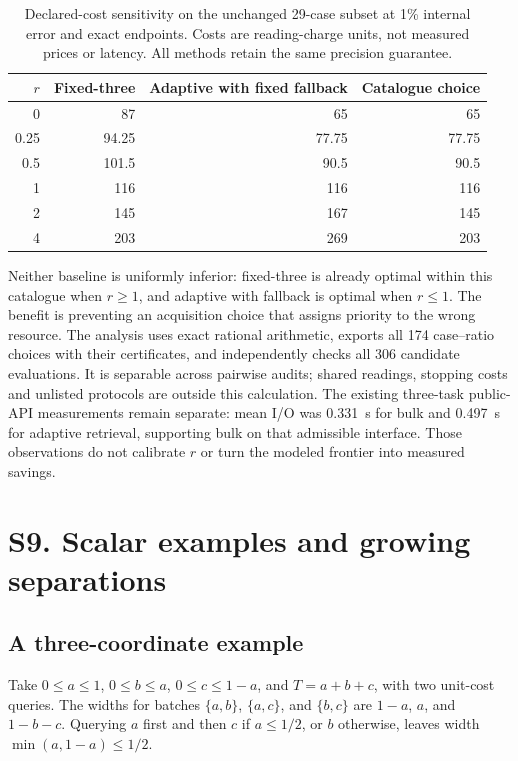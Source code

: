 \begin{table}[htbp]\centering\small
\caption{Declared-cost sensitivity on the unchanged 29-case subset at 1\%
internal error and exact endpoints. Costs are reading-charge units, not
measured prices or latency. All methods retain the same precision guarantee.}
\label{tab:protocol-cost-frontier}
\begin{tabular}{rrrr}\hline
$r$ & Fixed-three & Adaptive with fixed fallback & Catalogue choice\\\hline
0 & 87 & 65 & 65\\
0.25 & 94.25 & 77.75 & 77.75\\
0.5 & 101.5 & 90.5 & 90.5\\
1 & 116 & 116 & 116\\
2 & 145 & 167 & 145\\
4 & 203 & 269 & 203\\\hline
\end{tabular}\end{table}

Neither baseline is uniformly inferior: fixed-three is already optimal
within this catalogue when $r\geq1$, and adaptive with fallback is optimal
when $r\leq1$. The benefit is preventing an acquisition choice that assigns
priority to the wrong resource. The analysis uses exact rational arithmetic,
exports all 174 case--ratio choices with their certificates, and independently
checks all 306 candidate evaluations. It is separable across pairwise audits;
shared readings, stopping costs and unlisted protocols are outside this
calculation. The existing three-task public-API measurements remain separate:
mean I/O was 0.331~s for bulk and 0.497~s for adaptive retrieval, supporting
bulk on that admissible interface. Those observations do not calibrate $r$
or turn the modeled frontier into measured savings.
\section{S9. Scalar examples and growing separations}
\subsection{A three-coordinate example}
\label{sec:risk_small_example}
Take $0\le a\le1$, $0\le b\le a$, $0\le c\le1-a$, and
$T=a+b+c$, with two unit-cost queries. The widths for batches
$\{a,b\}$, $\{a,c\}$, and $\{b,c\}$ are $1-a$, $a$, and $1-b-c$.
Querying $a$ first and then $c$ if $a\le1/2$, or $b$ otherwise, leaves
width $\min(a,1-a)\le1/2$.

